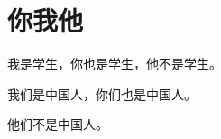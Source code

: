 \documentclass[12pt,UTF-8,openany]{ctexbook}
\begin{document}
\begin{center}
    
    
\end{center}


\hanzibox{}\hanzibox{}\hanzibox{}\hanzibox{}\hspace{1em}\hanzibox{}\hanzibox{}\hanzibox{}\hanzibox{}

\hanzibox{}\hanzibox{}\hanzibox{}\hanzibox{}\hspace{1em}\hanzibox{}\hanzibox{}\hanzibox{}\hanzibox{}

\hanzibox{}\hanzibox{}\hanzibox{}\hanzibox{}\hspace{1em}\hanzibox{}\hanzibox{}\hanzibox{}\hanzibox{}

\hanzibox{}\hanzibox{}\hanzibox{}\hanzibox{}\hspace{1em}




\chapter{你我他}

\begin{large}
    
    我是学生，你也是学生，他不是学生。
    
    我们是中国人，你们也是中国人。
    
    他们不是中国人。
    
\end{large}


\clearpage

\begin{center}
    
\end{center}


\hanzibox{}\hanzibox{}\hanzibox{}\hanzibox{}\hspace{1em}\hanzibox{}\hanzibox{}\hanzibox{}\hanzibox{}

\hanzibox{}\hanzibox{}\hanzibox{}\hanzibox{}\hspace{1em}\hanzibox{}\hanzibox{}\hanzibox{}\hanzibox{}
\end{document}
